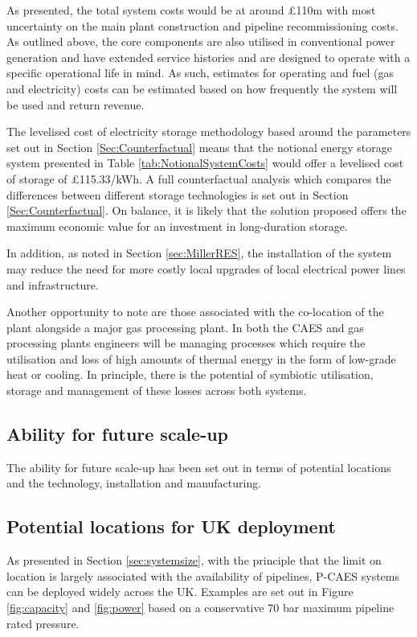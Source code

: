 \documentclass[preprint,12pt]{elsarticle}
\begin{document}
As presented, the total system costs would be at around £110m with most uncertainty on the main plant construction and pipeline recommissioning costs. As outlined above, the core components are also utilised in conventional power generation and have extended service histories and are designed to operate with a specific operational life in mind. As such, estimates for operating and fuel (gas and electricity) costs can be estimated based on how frequently the system will be used and return revenue. 

The levelised cost of electricity storage methodology based around the parameters set out in Section \ref{Sec:Counterfactual} means that the notional energy storage system presented in Table \ref{tab:NotionalSystemCosts} would offer a levelised cost of storage of £115.33/kWh. A full counterfactual analysis which compares the differences between different storage technologies is set out in Section \ref{Sec:Counterfactual}. On balance, it is likely that the solution proposed offers the maximum economic value for an investment in long-duration storage.

In addition, as noted in Section \ref{sec:MillerRES}, the installation of the system may reduce the need for more costly local upgrades of local electrical power lines and infrastructure. 

Another opportunity to note are those associated with the co-location of the plant alongside a major gas processing plant. In both the CAES and gas processing plants engineers will be managing processes which require the utilisation and loss of high amounts of thermal energy in the form of low-grade heat or cooling. In principle, there is the potential of symbiotic utilisation, storage and management of these losses across both systems. 

\subsection{Ability for future scale-up}

The ability for future scale-up has been set out in terms of potential locations and the technology, installation and manufacturing.

\subsection{Potential locations for UK deployment}
As presented in Section \ref{sec:systemsize}, with the principle that the limit on location is largely associated with the availability of pipelines, P-CAES systems can be deployed widely across the UK. Examples are set out in Figure \ref{fig:capacity} and \ref{fig:power} based on a conservative 70 bar maximum pipeline rated pressure.
\end{document}
